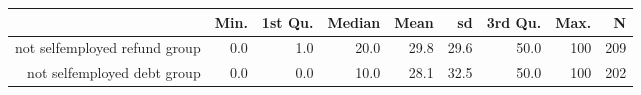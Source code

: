 \begin{table}[ht]
\centering
\begin{tabular}{rrrrrrrrr}
  \hline
 & Min. & 1st Qu. & Median & Mean & sd & 3rd Qu. & Max. & N \\ 
  \hline
not selfemployed refund group & 0.0 & 1.0 & 20.0 & 29.8 & 29.6 & 50.0 & 100 & 209 \\ 
  not selfemployed debt group & 0.0 & 0.0 & 10.0 & 28.1 & 32.5 & 50.0 & 100 & 202 \\ 
   \hline
\end{tabular}
\end{table}
